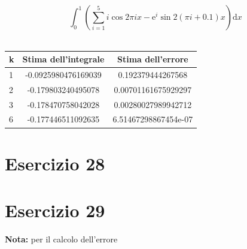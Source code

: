 \documentclass[10pt,a4paper]{article}
\begin{document}
$$\int_{0}^{1}\left(\sum_{i=1}^{5}i\cos2\pi i x-\mathrm{e}^{i}\sin2(\pi i+0.1)x\right)\mathrm{d}x$$
\\
\begin{table}[h]
	\large
	\centering
	\begin{tabular}{|l|c|c|}
		\hline
		k & Stima dell'integrale & Stima dell'errore \\
		\hline
		1 & -0.0925980476169039 & 0.192379444267568   \\
		2 & -0.179803240495078 & 0.00701161675929297  \\
		3 & -0.178470758042028 & 0.00280027989942712  \\
		6 & -0.177446511092635 & 6.51467298867454e-07 \\
		\hline
	\end{tabular}
\end{table}

\section*{Esercizio 28}

\section*{Esercizio 29}
\textbf{Nota:} per il calcolo dell'errore 
\end{document}
